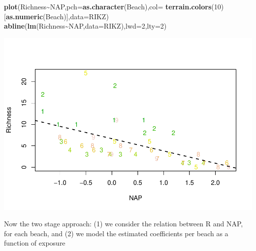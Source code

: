 \documentclass[
]{book}
\newenvironment{Shaded}{\begin{snugshade}}{\end{snugshade}}
\newcommand{\AttributeTok}[1]{\textcolor[rgb]{0.13,0.29,0.53}{#1}}
\newcommand{\DecValTok}[1]{\textcolor[rgb]{0.00,0.00,0.81}{#1}}
\newcommand{\FunctionTok}[1]{\textcolor[rgb]{0.13,0.29,0.53}{\textbf{#1}}}
\newcommand{\NormalTok}[1]{#1}
\newcommand{\SpecialCharTok}[1]{\textcolor[rgb]{0.81,0.36,0.00}{\textbf{#1}}}
\begin{document}
\begin{Shaded}
\begin{Highlighting}[]
\FunctionTok{plot}\NormalTok{(Richness}\SpecialCharTok{\textasciitilde{}}\NormalTok{NAP,}\AttributeTok{pch=}\FunctionTok{as.character}\NormalTok{(Beach),}\AttributeTok{col=} \FunctionTok{terrain.colors}\NormalTok{(}\DecValTok{10}\NormalTok{)[}\FunctionTok{as.numeric}\NormalTok{(Beach)],}\AttributeTok{data=}\NormalTok{RIKZ)}
\FunctionTok{abline}\NormalTok{(}\FunctionTok{lm}\NormalTok{(Richness}\SpecialCharTok{\textasciitilde{}}\NormalTok{NAP,}\AttributeTok{data=}\NormalTok{RIKZ),}\AttributeTok{lwd=}\DecValTok{2}\NormalTok{,}\AttributeTok{lty=}\DecValTok{2}\NormalTok{)}
\end{Highlighting}
\end{Shaded}

\includegraphics{ECOMODbook_files/figure-latex/unnamed-chunk-63-1.pdf}

Now the two stage approach: (1) we consider the relation between R and NAP, for each beach, and (2) we model the estimated coefficients per beach as a function of exposure
\end{document}
